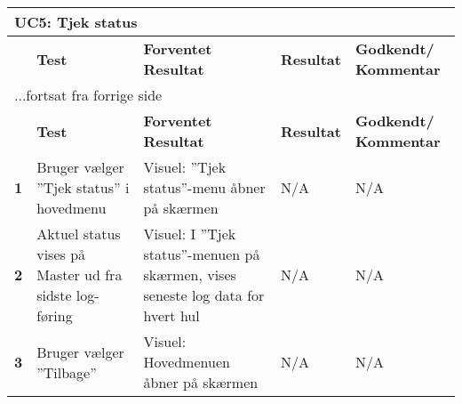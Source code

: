 \begin{center}
\begin{longtable}{|p{}|p{}|p{}|p{}|p{}|} %
\hline
\multicolumn{5}{|l|}{\textbf{UC5: Tjek status}} \\ \hline
\multicolumn{1}{|c|}{} &
\textbf{Test} &
\textbf{Forventet \newline Resultat} &
\textbf{Resultat} &
\textbf{Godkendt/ \newline Kommentar} \\ \hline 
\endfirsthead

\multicolumn{5}{l}{...fortsat fra forrige side} \\ \hline 
\multicolumn{1}{|c|}{} &
\textbf{Test} &
\textbf{Forventet \newline Resultat} &
\textbf{Resultat} &
\textbf{Godkendt/ \newline Kommentar} \\ \hline 
\endhead

\textbf{1}	&Bruger vælger ''Tjek status'' i hovedmenu
			&Visuel: ''Tjek status''-menu åbner på skærmen
			&N/A
			&N/A \\ \hline 
			
\textbf{2}	&Aktuel status vises på Master ud fra sidste log-føring
			&Visuel: I ''Tjek status''-menuen på skærmen, vises seneste log data for hvert hul
			&N/A
			&N/A \\ \hline 

\textbf{3}	&Bruger vælger ''Tilbage''
			&Visuel: Hovedmenuen åbner på skærmen
			&N/A
			&N/A \\ \hline 
			
\end{longtable}
	\label{ATUC7} 
\end{center}
